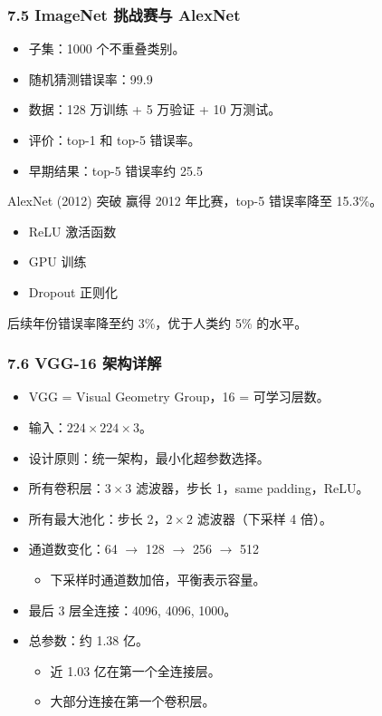 \documentclass[t,aspectratio=169]{beamer} %
\begin{document}
\begin{frame}
    \frametitle{7.5 ImageNet 挑战赛与 AlexNet}
    \begin{itemize}
        \item 子集：1000 个不重叠类别。
        \item 随机猜测错误率：99.9%
        \item 数据：128 万训练 + 5 万验证 + 10 万测试。
        \item 评价：\alert{top-1} 和 \alert{top-5} 错误率。
        \item 早期结果：top-5 错误率约 25.5%
    \end{itemize}
    \begin{block}{AlexNet (2012) 突破}
        赢得 2012 年比赛，top-5 错误率降至 \alert{15.3\%}。
        \begin{itemize}
            \item \alert{ReLU} 激活函数
            \item \alert{GPU} 训练
            \item \alert{Dropout} 正则化
        \end{itemize}
        后续年份错误率降至约 3\%，优于人类约 5\% 的水平。
    \end{block}
\end{frame}

\begin{frame}
    \frametitle{7.6 VGG-16 架构详解}
    \begin{itemize}
        \item VGG = Visual Geometry Group，16 = 可学习层数。
        \item 输入：$224 \times 224 \times 3$。
        \item 设计原则：\alert{统一架构}，最小化超参数选择。
        \item 所有卷积层：$3 \times 3$ 滤波器，步长 1，same padding，ReLU。
        \item 所有最大池化：步长 2，$2 \times 2$ 滤波器（下采样 4 倍）。
        \item 通道数变化：64 $\to$ 128 $\to$ 256 $\to$ 512
        \begin{itemize}
            \item 下采样时\alert{通道数加倍}，平衡表示容量。
        \end{itemize}
        \item 最后 3 层\alert{全连接}：4096, 4096, 1000。
        \item 总参数：约 \alert{1.38 亿}。
        \begin{itemize}
            \item 近 1.03 亿在\alert{第一个全连接层}。
            \item 大部分连接在第一个卷积层。
        \end{itemize}
    \end{itemize}
\end{frame}
\end{document}
